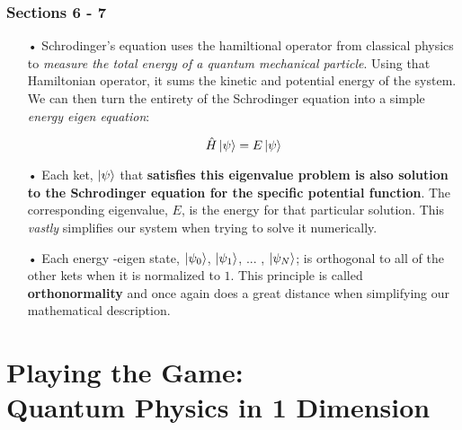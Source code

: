 \documentclass[12pt,letterpaper]{book}
\begin{document}

\subsection*{Sections 6 - 7}

\begin{enumerate}

\item[•]Schrodinger's equation uses the hamiltional operator from classical physics to \textit{measure the total energy of a quantum mechanical particle}. Using that Hamiltonian operator, it sums the kinetic and potential energy of the system. We can then turn the entirety of the Schrodinger equation into a simple \textit{energy eigen equation}:

\begin{equation}
\hat{H}\ket{\psi} = E\ket{\psi}
\end{equation}

\item[•]Each ket, $\ket{\psi}$ that \textbf{satisfies this eigenvalue problem is also solution to the Schrodinger equation for the specific potential function}. The corresponding eigenvalue, $E$, is the energy for that particular solution. This \textit{vastly} simplifies our system when trying to solve it numerically.

\item[•]Each energy -eigen state, $\ket{\psi_0}$, $\ket{\psi_1}$, ... , $\ket{\psi_N}$; is orthogonal to all of the other kets when it is normalized to $1$. This principle is called \textbf{orthonormality} and once again does a great distance when simplifying our mathematical description.

\end{enumerate}





\chapter{Playing the Game: \\ Quantum Physics in 1 Dimension}

\end{document}
